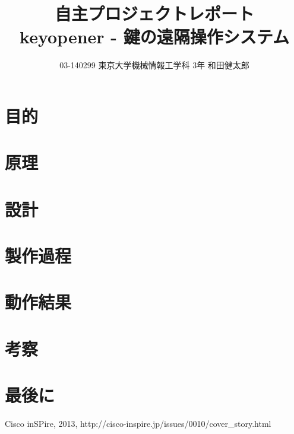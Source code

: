 \documentclass[a4paper,10pt]{jarticle}
\title{
  自主プロジェクトレポート \\
  keyopener - 鍵の遠隔操作システム
}
\author{03-140299 東京大学機械情報工学科 3年 和田健太郎}
\begin{document}
\maketitle



\section{目的}

\section{原理}
\section{設計}
\section{製作過程}
\section{動作結果}
\section{考察}
% 

\section{最後に}


\begin{thebibliography}{9}
   Cisco inSPire, 2013, http://cisco-inspire.jp/issues/0010/cover\_story.html
\end{thebibliography}
\end{document}

